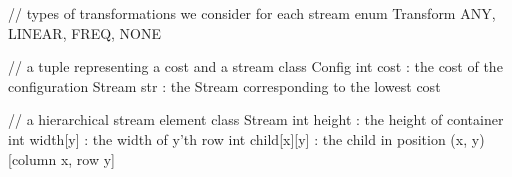 // types of transformations we consider for each stream
enum Transform { ANY, LINEAR, FREQ, NONE }

// a tuple representing a cost and a stream
class Config {
  int cost          : the cost of the configuration
  Stream str        : the Stream corresponding to the lowest cost
}

// a hierarchical stream element
class Stream {
  int height        : the height of container
  int width[y]      : the width of y'th row
  int child[x][y]   : the child in position (x, y)  [column x, row y]
}